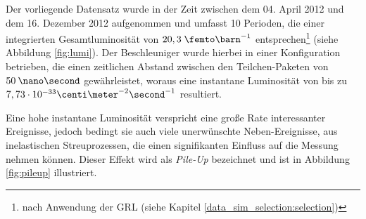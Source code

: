Der vorliegende Datensatz wurde in der Zeit zwischen dem 04. April 2012 und dem
16. Dezember 2012 aufgenommen und umfasst 10 Perioden, die einer integrierten
Gesamtluminosität von $20,3 \fb^{-1}$ entsprechen\footnote{nach Anwendung der
\ac{GRL} (siehe Kapitel \ref{data_sim_selection:selection})} (siehe Abbildung
\ref{fig:lumi}). Der Beschleuniger wurde hierbei in einer Konfiguration
betrieben, die einen zeitlichen Abstand zwischen den Teilchen-Paketen von
$50\:\nano\second$ gewährleistet, woraus eine instantane Luminosität von bis zu
$7,73 \cdot 10^{-33} \centi\meter^{-2}\second^{-1}$ resultiert.

Eine hohe instantane Luminosität verspricht eine große Rate interessanter
Ereignisse, jedoch bedingt sie auch viele unerwünschte Neben-Ereignisse, aus
inelastischen Streuprozessen, die einen signifikanten Einfluss auf die Messung
nehmen können. Dieser Effekt wird als \textit{Pile-Up} bezeichnet und ist in
Abbildung \ref{fig:pileup} illustriert.

